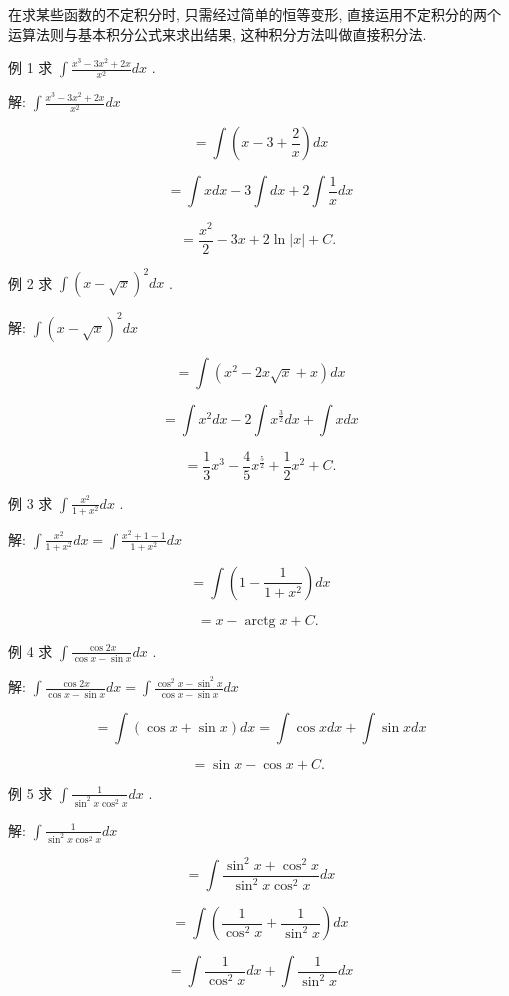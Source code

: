 \documentclass[lang=cn,newtx,12pt,scheme=chinese]{elegantbook}
\begin{document}
在求某些函数的不定积分时, 只需经过简单的恒等变形, 直接运用不定积分的两个运算法则与基本积分公式来求出结果, 这种积分方法叫做直接积分法.

例 1 求 \(\int \frac{{x}^{3} - 3{x}^{2} + {2x}}{{x}^{2}}{dx}\) .

解: \(\int \frac{{x}^{3} - 3{x}^{2} + {2x}}{{x}^{2}}{dx}\)

\[
= \int \left( {x - 3 + \frac{2}{x}}\right) {dx}
\]

\[
= \int {xdx} - 3\int {dx} + 2\int \frac{1}{x}{dx}
\]

\[
= \frac{{x}^{2}}{2} - {3x} + 2\ln \left| x\right| + C\text{. }
\]

例 2 求 \(\int {\left( x - \sqrt{x}\right) }^{2}{dx}\) .

解: \(\int {\left( x - \sqrt{x}\right) }^{2}{dx}\)

\[
= \int \left( {{x}^{2} - {2x}\sqrt{x} + x}\right) {dx}
\]

\[
= \int {x}^{2}{dx} - 2\int {x}^{\frac{3}{2}}{dx} + \int {xdx}
\]

\[
= \frac{1}{3}{x}^{3} - \frac{4}{5}{x}^{\frac{5}{2}} + \frac{1}{2}{x}^{2} + C.
\]

例 3 求 \(\int \frac{{x}^{2}}{1 + {x}^{2}}{dx}\) .

解: \(\int \frac{{x}^{2}}{1 + {x}^{2}}{dx} = \int \frac{{x}^{2} + 1 - 1}{1 + {x}^{2}}{dx}\)

\[
= \int \left( {1 - \frac{1}{1 + {x}^{2}}}\right) {dx}
\]

\[
= x - \operatorname{arctg}x + C\text{. }
\]

例 4 求 \(\int \frac{\cos {2x}}{\cos x - \sin x}{dx}\) .

解: \(\int \frac{\cos {2x}}{\cos x - \sin x}{dx} = \int \frac{{\cos }^{2}x - {\sin }^{2}x}{\cos x - \sin x}{dx}\)

\[
= \int \left( {\cos x + \sin x}\right) {dx} = \int \cos {xdx} + \int \sin {xdx}
\]

\[
= \sin x - \cos x + C\text{. }
\]

例 5 求 \(\int \frac{1}{{\sin }^{2}x{\cos }^{2}x}{dx}\) .

解: \(\int \frac{1}{{\sin }^{2}x{\cos }^{2}x}{dx}\)

\[
= \int \frac{{\sin }^{2}x + {\cos }^{2}x}{{\sin }^{2}x{\cos }^{2}x}{dx}
\]

\[
= \int \left( {\frac{1}{{\cos }^{2}x} + \frac{1}{{\sin }^{2}x}}\right) {dx}
\]

\[
= \int \frac{1}{{\cos }^{2}x}{dx} + \int \frac{1}{{\sin }^{2}x}{dx}
\]
\end{document}
